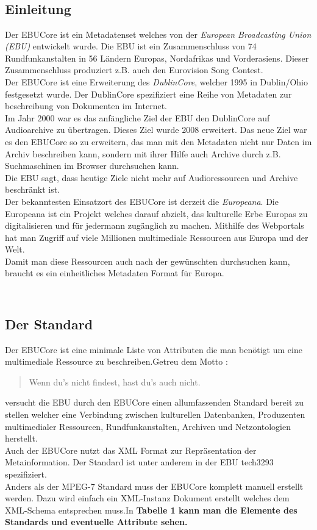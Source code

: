 	\subsection{\\Einleitung\\}
	Der EBUCore ist ein Metadatenset welches von der \emph{European Broadcasting Union (EBU)} entwickelt wurde. Die EBU ist ein Zusammenschluss von 74 Rundfunkanstalten  in 56 Ländern Europas, Nordafrikas und Vorderasiens. Dieser Zusammenschluss produziert z.B. auch den Eurovision Song Contest.\\ Der EBUCore ist eine Erweiterung des \emph{DublinCore}, welcher 1995 in Dublin/Ohio festgesetzt wurde. Der DublinCore spezifiziert eine Reihe von Metadaten zur beschreibung von Dokumenten im Internet.\\ Im Jahr 2000 war es das anfängliche Ziel der EBU den DublinCore auf Audioarchive zu übertragen. Dieses Ziel wurde 2008 erweitert. Das neue Ziel war es den EBUCore so zu erweitern, das man mit den Metadaten nicht nur Daten im Archiv beschreiben kann, sondern mit ihrer Hilfe auch Archive durch z.B. Suchmaschinen im Browser durchsuchen kann.\\Die EBU sagt, dass heutige Ziele nicht mehr auf Audioressourcen und Archive beschränkt ist.\\Der bekanntesten Einsatzort des EBUCore ist derzeit die \emph{Europeana}. Die Europeana ist ein Projekt welches darauf abzielt, das kulturelle Erbe Europas zu digitalisieren und für jedermann zugänglich zu machen. Mithilfe des Webportals hat man Zugriff auf viele Millionen multimediale Ressourcen aus Europa und der Welt.\\Damit man diese Ressourcen auch nach der gewünschten durchsuchen kann, braucht es ein einheitliches Metadaten Format für Europa.
	
	\subsection{\\Der Standard\\}
	Der EBUCore ist eine minimale Liste von Attributen die man benötigt um eine multimediale Ressource zu beschreiben.Getreu dem Motto :\begin{quote}Wenn du's nicht findest, hast du's auch nicht.\end{quote} versucht die EBU durch den EBUCore einen allumfassenden Standard bereit zu stellen welcher eine Verbindung zwischen kulturellen Datenbanken, Produzenten multimedialer Ressourcen, Rundfunkanstalten, Archiven und Netzontologien herstellt.\\
Auch der EBUCore nutzt das XML Format zur Repräsentation der Metainformation. Der Standard ist unter anderem in der EBU tech3293 spezifiziert.\\Anders als der MPEG-7 Standard muss der EBUCore komplett manuell erstellt werden. Dazu wird einfach ein XML-Instanz Dokument erstellt welches dem XML-Schema entsprechen muss.In \bf{Tabelle 1} kann man die Elemente des Standards und eventuelle Attribute sehen.\\

